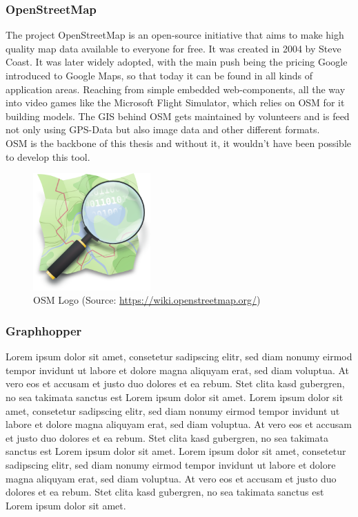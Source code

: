 \Author{\daAuthorTwo}

\subsubsection{OpenStreetMap}
The project OpenStreetMap is an open-source initiative that aims to make high quality map data available to everyone for free. It was created in 2004 by Steve Coast. It was later widely adopted, with the main push being the pricing Google introduced to Google Maps, so that today it can be found in all kinds of application areas. Reaching from simple embedded web-components, all the way into video games like  the Microsoft Flight Simulator, which relies on OSM for it building models. The GIS behind OSM gets maintained by volunteers and is feed not only using GPS-Data but also image data and other different formats.\\ OSM is the backbone of this thesis and without it, it wouldn't have been possible to develop this tool.

\autocite{OSMWayback}
\autocite{wiki:OSM}

\begin{figure} [H]
    \center
    \includegraphics [width=0.4\textwidth] {images/Technologies/osmLogo.png}
    \caption{OSM Logo (Source: \url{https://wiki.openstreetmap.org/})}
\end{figure}

\subsubsection{Graphhopper}
Lorem ipsum dolor sit amet, consetetur sadipscing elitr, sed diam nonumy eirmod tempor invidunt ut labore et dolore magna aliquyam erat, sed diam voluptua. At vero eos et accusam et justo duo dolores et ea rebum. Stet clita kasd gubergren, no sea takimata sanctus est Lorem ipsum dolor sit amet. Lorem ipsum dolor sit amet, consetetur sadipscing elitr, sed diam nonumy eirmod tempor invidunt ut labore et dolore magna aliquyam erat, sed diam voluptua. At vero eos et accusam et justo duo dolores et ea rebum. Stet clita kasd gubergren, no sea takimata sanctus est Lorem ipsum dolor sit amet. Lorem ipsum dolor sit amet, consetetur sadipscing elitr, sed diam nonumy eirmod tempor invidunt ut labore et dolore magna aliquyam erat, sed diam voluptua. At vero eos et accusam et justo duo dolores et ea rebum. Stet clita kasd gubergren, no sea takimata sanctus est Lorem ipsum dolor sit amet.   

